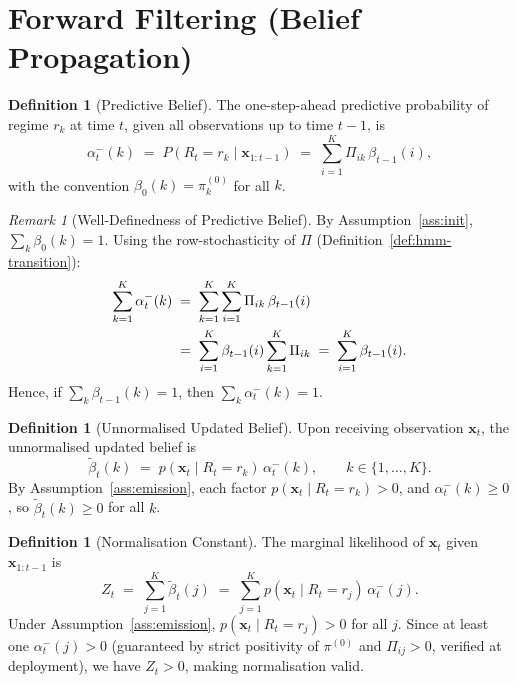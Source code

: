 \documentclass[12pt,openany]{book}
\newcommand{\bfx}{\mathbf{x}}
\numberwithin{equation}{chapter}
\theoremstyle{plain}
\theoremstyle{definition}
\newtheorem{definition}[theorem]{Definition}
\theoremstyle{remark}
\newtheorem{remark}[theorem]{Remark}
\numberwithin{equation}{chapter}
\theoremstyle{plain}
\begin{document}
\section{Forward Filtering (Belief Propagation)}
\label{sec:hmm-filter}

\begin{definition}[Predictive Belief]
\label{def:hmm-predictive}
The one-step-ahead predictive probability of regime $r_k$ at time $t$,
given all observations up to time $t-1$, is
\begin{equation}
  \alpha_t^{-}(k)
  \;=\;
  P(R_t = r_k \mid \bfx_{1:t-1})
  \;=\;
  \sum_{i=1}^{K} \Pi_{ik}\,\beta_{t-1}(i),
  \label{eq:hmm-predictive}
\end{equation}
with the convention $\beta_0(k) = \pi^{(0)}_k$ for all $k$.
\end{definition}

\begin{remark}[Well-Definedness of Predictive Belief]
\label{rem:predictive-valid}
By Assumption~\ref{ass:init}, $\sum_k \beta_0(k) = 1$.  Using the
row-stochasticity of $\Pi$ (Definition~\ref{def:hmm-transition}):
\begin{align}
  \sum_{k=1}^{K} \alpha_t^{-}(k)
  &\;=\; \sum_{k=1}^{K} \sum_{i=1}^{K} \Pi_{ik}\,\beta_{t-1}(i)
  \notag\\
  &\;=\; \sum_{i=1}^{K} \beta_{t-1}(i) \sum_{k=1}^{K} \Pi_{ik}
  \;=\; \sum_{i=1}^{K} \beta_{t-1}(i).
  \label{eq:predictive-sum}
\end{align}
Hence, if $\sum_k \beta_{t-1}(k) = 1$, then $\sum_k \alpha_t^{-}(k) = 1$.
\end{remark}

\begin{definition}[Unnormalised Updated Belief]
\label{def:hmm-unnorm}
Upon receiving observation $\bfx_t$, the unnormalised updated belief is
\begin{equation}
  \tilde{\beta}_t(k)
  \;=\;
  p\!\left(\bfx_t \mid R_t = r_k\right)\,\alpha_t^{-}(k),
  \qquad k \in \{1,\ldots,K\}.
  \label{eq:hmm-unnorm}
\end{equation}
By Assumption~\ref{ass:emission}, each factor $p(\bfx_t \mid R_t = r_k) > 0$,
and $\alpha_t^{-}(k) \geq 0$, so $\tilde{\beta}_t(k) \geq 0$ for all $k$.
\end{definition}

\begin{definition}[Normalisation Constant]
\label{def:hmm-norm-const}
The marginal likelihood of $\bfx_t$ given $\bfx_{1:t-1}$ is
\begin{equation}
  Z_t
  \;=\;
  \sum_{j=1}^{K} \tilde{\beta}_t(j)
  \;=\;
  \sum_{j=1}^{K}
    p\!\left(\bfx_t \mid R_t = r_j\right)\,\alpha_t^{-}(j).
  \label{eq:hmm-Zt}
\end{equation}
Under Assumption~\ref{ass:emission}, $p(\bfx_t \mid R_t = r_j) > 0$ for
all $j$.  Since at least one $\alpha_t^{-}(j) > 0$ (guaranteed by
strict positivity of $\pi^{(0)}$ and $\Pi_{ij} > 0$, verified at
deployment), we have $Z_t > 0$, making normalisation valid.
\end{definition}
\end{document}
